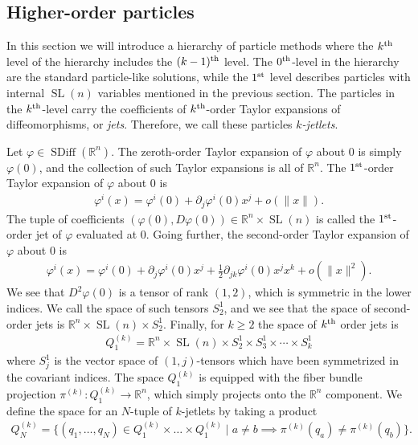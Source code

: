 \documentclass[12pt]{amsart}
\newcommand{\R}{\ensuremath{\mathbb{R}}}
\DeclareMathOperator{\SDiff}{SDiff}
\DeclareMathOperator{\SL}{SL}
\begin{document}
  \subsection{Higher-order particles}
  \label{sec:higher_order}
  In this section we will introduce a hierarchy of particle methods
  where the $k^{\rm th}$ level of the hierarchy includes the $(k-1)^{\rm th}$
  level.
  The $0^{\rm th}$-level in the hierarchy are the standard particle-like solutions,
  while the $1^{\rm st}$ level describes particles with internal $\SL(n)$ variables
  mentioned in the previous section.
  The particles in the $k^{\rm th}$-level carry the coefficients of
  $k^{\rm th}$-order Taylor expansions of diffeomorphisms,
  or \emph{jets}.
  Therefore, we call these particles \emph{$k$-jetlets}.

  Let $\varphi \in \SDiff(\R^n)$.
  The zeroth-order Taylor expansion of $\varphi$ about $0$
  is simply $\varphi(0)$, and the collection of such Taylor
  expansions is all of $\R^n$.
  The $1^{\rm st}$-order Taylor expansion of $\varphi$ about $0$ is
  \begin{align*}
    \varphi^i( x) = \varphi^i(0) + \partial_j \varphi^i(0) x^j + o( \|x\|).
  \end{align*}
  The tuple of coefficients $(\varphi(0) , D\varphi(0) ) \in \R^n \times \SL(n)$ is
  called the $1^{\rm st}$-order jet of $\varphi$ evaluated at $0$.
  Going further, the second-order Taylor expansion of $\varphi$ about $0$
  is
  \begin{align*}
    \varphi^i(x) = \varphi^i(0) + \partial_j \varphi^i(0) x^j + 
    \frac{1}{2} \partial_{jk} \varphi^i(0) x^j x^k + o( \| x\|^2).
  \end{align*}
  We see that $D^2\varphi(0)$ is a tensor of rank $(1,2)$, which is
  symmetric in the lower indices.
  We call the space of such tensors $S^1_2$,
  and we see that the space of second-order jets is $\R^n \times \SL(n) \times S^1_2$.
  Finally, for $k \geq 2$ the space of $k^{\rm th}$ order jets is
  \begin{align*}
    Q_1^{(k)} = \R^n \times \SL(n) \times S^1_2 \times S^1_3 \times \cdots\times S^1_k
  \end{align*}
  where $S^1_j$ is the vector space of $(1,j)$-tensors which
  have been symmetrized in the covariant indices.
  The space $Q_1^{(k)}$ is equipped with the fiber bundle
  projection $\pi^{(k)} : Q_1^{(k)} \to \R^n$,
  which simply projects onto the $\R^n$ component.
  We define the space for an $N$-tuple of $k$-jetlets by taking a product
  \begin{align*}
    Q^{(k)}_N = \{ (q_1,\dots, q_N) \in Q_1^{(k)} \times \dots \times Q_1^{(k)}
    \mid a \neq b \implies \pi^{(k)}(q_a) \neq \pi^{(k)}(q_b) \}.
  \end{align*}
\end{document}
